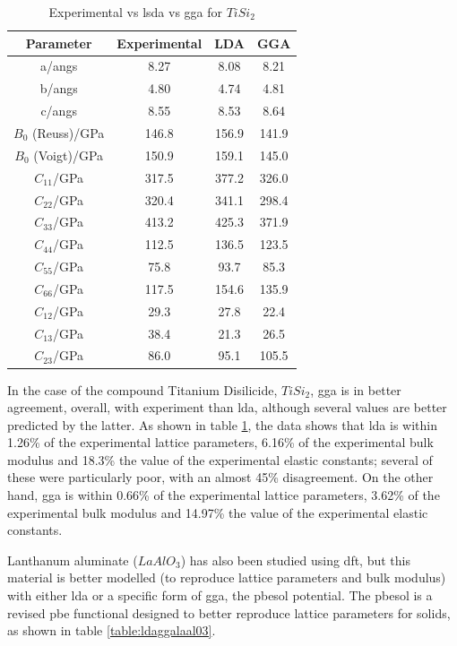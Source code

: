 \begin{table}[h]
\begin{center}
\renewcommand{\arraystretch}{1.2}
\begin{tabular}{c c c c}
\hline\hline
Parameter & Experimental & LDA & GGA  \\
\hline\hline
a/angs & 8.27 & 8.08 & 8.21 \\
b/angs & 4.80 & 4.74 & 4.81 \\
c/angs & 8.55 & 8.53 & 8.64 \\
$B_0$ (Reuss)/GPa & 146.8 & 156.9 & 141.9 \\
$B_0$ (Voigt)/GPa & 150.9 & 159.1 & 145.0 \\
$C_{11}$/GPa & 317.5 & 377.2 & 326.0 \\
$C_{22}$/GPa & 320.4 & 341.1 & 298.4 \\
$C_{33}$/GPa & 413.2 & 425.3 & 371.9 \\
$C_{44}$/GPa & 112.5 & 136.5 & 123.5 \\
$C_{55}$/GPa & 75.8 & 93.7 & 85.3 \\
$C_{66}$/GPa & 117.5 & 154.6 & 135.9 \\
$C_{12}$/GPa & 29.3 & 27.8 & 22.4 \\
$C_{13}$/GPa & 38.4 & 21.3 & 26.5 \\
$C_{23}$/GPa & 86.0 & 95.1 & 105.5 \\
\hline\hline
\end{tabular}
\end{center}
\caption{Experimental vs \acrshort{lsda} vs \acrshort{gga} for $TiSi_2$\cite{DftTiSiRavindran}}
\label{table:ldaggatisi2}
\end{table}

In the case of the compound Titanium Disilicide, $TiSi_2$, \acrshort{gga} is in better agreement, overall, with experiment than \acrshort{lda}, although several values are better predicted by the latter.  As shown in table \ref{table:ldaggatisi2}, the data shows that \acrshort{lda} is within 1.26\% of the experimental lattice parameters, 6.16\% of the experimental bulk modulus and 18.3\% the value of the experimental elastic constants; several of these were particularly poor, with an almost 45\% disagreement.  On the other hand, \acrshort{gga} is within 0.66\% of the experimental lattice parameters, 3.62\% of the experimental bulk modulus and 14.97\% the value of the experimental elastic constants\cite{DftTiSiRavindran}.

Lanthanum aluminate ($LaAlO_3$) has also been studied using \acrshort{dft}, but this material is better modelled (to reproduce lattice parameters and bulk modulus) with either \acrshort{lda} or a specific form of \acrshort{gga}, the \acrfull{pbesol} potential.  The \acrshort{pbesol} is a revised \acrshort{pbe} functional designed to better reproduce lattice parameters for solids, as shown in table \ref{table:ldaggalaal03}.


